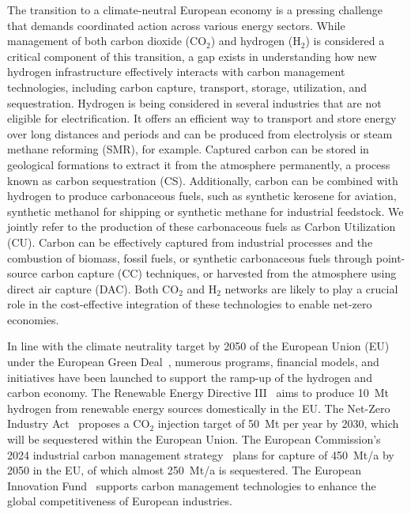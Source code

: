 \documentclass[twocolumn]{article}
\newcommand{\carbon}{CO$_2$}
\newcommand{\hydrogen}{H$_2$}
\begin{document}
The transition to a climate-neutral European economy is a pressing challenge that demands coordinated action across various energy sectors. While management of both carbon dioxide (\carbon{}) and hydrogen (\hydrogen{}) is considered a critical component of this transition, a gap exists in understanding how new hydrogen infrastructure effectively interacts with carbon management technologies, including carbon capture, transport, storage, utilization, and sequestration. Hydrogen is being considered in several industries that are not eligible for electrification. It offers an efficient way to transport and store energy over long distances and periods and can be produced from electrolysis or steam methane reforming (SMR), for example. Captured carbon can be stored in geological formations to extract it from the atmosphere permanently, a process known as carbon sequestration (CS). Additionally, carbon can be combined with hydrogen to produce carbonaceous fuels, such as synthetic kerosene for aviation, synthetic methanol for shipping or synthetic methane for industrial feedstock. We jointly refer to the production of these carbonaceous fuels as Carbon Utilization (CU). Carbon can be effectively captured from industrial processes and the combustion of biomass, fossil fuels, or synthetic carbonaceous fuels through point-source carbon capture (CC) techniques, or harvested from the atmosphere using direct air capture (DAC). Both \carbon{} and \hydrogen{} networks are likely to play a crucial role in the cost-effective integration of these technologies to enable net-zero economies.

In line with the climate neutrality target by 2050 of the European Union (EU) under the European Green Deal~\cite{europeangreendeal}, numerous programs, financial models, and initiatives have been launched to support the ramp-up of the hydrogen and carbon economy. The Renewable Energy Directive III~\cite{DirectiveEU20232023} aims to produce 10~Mt hydrogen from renewable energy sources domestically in the EU. The Net-Zero Industry Act~\cite{eu2023netzero} proposes a \carbon{} injection target of 50~Mt per year by 2030, which will be sequestered within the European Union. The European Commission's 2024 industrial carbon management strategy~\cite{comcms} plans for capture of 450~Mt/a by 2050 in the EU, of which almost 250~Mt/a is sequestered.  The European Innovation Fund~\cite{europeaninnovationfund} supports carbon management technologies to enhance the global competitiveness of European industries.
\end{document}
